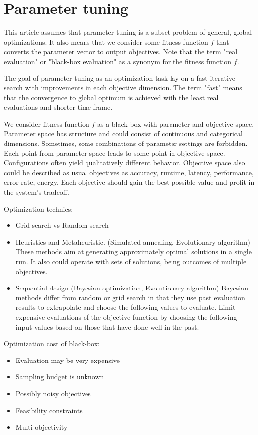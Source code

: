     \section{Parameter tuning}
        This article assumes that parameter tuning is a subset problem of general, global optimizations. It also means that we consider some fitness function $f$ that converts the parameter vector to output objectives.  Note that the term "real evaluation" or "black-box evaluation" as a synonym for the fitness function $f$. 
        
        The goal of parameter tuning as an optimization task lay on a fast iterative search with improvements in each objective dimension. The term "fast" means that the convergence to global optimum is achieved with the least real evaluations and shorter time frame.

        We consider fitness function $f$ as a black-box with parameter and objective space. Parameter space has structure and could consist of continuous and categorical dimensions. Sometimes, some combinations of parameter settings are forbidden. Each point from parameter space leads to some point in objective space. Configurations often yield qualitatively different behavior.
        Objective space also could be described as usual objectives as accuracy, runtime, latency, performance, error rate, energy. Each objective should gain the best possible value and profit in the system's tradeoff.

        Optimization technics:
        \begin{itemize}
            \item Grid search vs Random search
            \item Heuristics and Metaheuristic. (Simulated annealing, Evolutionary algorithm) These methods aim at generating approximately optimal solutions in a single run. It also could operate with sets of solutions, being outcomes of multiple objectives.
            \item Sequential design (Bayesian optimization, Evolutionary algorithm) Bayesian methods differ from random or grid search in that they use past evaluation results to extrapolate and choose the following values to evaluate. Limit expensive evaluations of the objective function by choosing the following input values based on those that have done well in the past.
        \end{itemize}

        Optimization cost of black-box:
        \begin{itemize}
            \item Evaluation may be very expensive
            \item Sampling budget is unknown
            \item Possibly noisy objectives
            \item Feasibility constraints
            \item Multi-objectivity
        \end{itemize}

